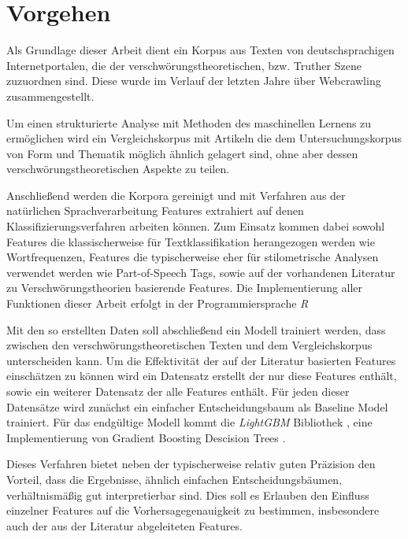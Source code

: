 \section{Vorgehen}

Als Grundlage dieser Arbeit dient ein Korpus aus Texten von deutschsprachigen Internetportalen, die der verschwörungstheoretischen, bzw. Truther Szene zuzuordnen sind.
Diese wurde im Verlauf der letzten Jahre über Webcrawling zusammengestellt.

Um einen strukturierte Analyse mit Methoden des maschinellen Lernens zu ermöglichen wird ein Vergleichskorpus mit Artikeln die dem Untersuchungskorpus von Form und Thematik möglich ähnlich gelagert sind, ohne aber dessen verschwörungstheoretischen Aspekte zu teilen.

Anschließend werden die Korpora gereinigt und mit Verfahren aus der natürlichen Sprachverarbeitung Features extrahiert auf denen Klassifizierungsverfahren arbeiten können.
Zum Einsatz kommen dabei sowohl Features die klassischerweise für Textklassifikation herangezogen werden wie Wortfrequenzen, Features die typischerweise eher für stilometrische Analysen verwendet werden wie Part-of-Speech Tags, sowie auf der vorhandenen Literatur zu Verschwörungstheorien basierende Features.
Die Implementierung aller Funktionen dieser Arbeit erfolgt in der Programmiersprache \textit{R} \parencite{r_2021}

Mit den so erstellten Daten soll abschließend ein Modell trainiert werden, dass zwischen den verschwörungstheoretischen Texten und dem Vergleichskorpus unterscheiden kann.
Um die Effektivität der auf der Literatur basierten Features einschätzen zu können wird ein Datensatz erstellt der nur diese Features enthält, sowie ein weiterer Datensatz der alle Features enthält.
Für jeden dieser Datensätze wird zunächst ein einfacher Entscheidungsbaum als Baseline Model trainiert.
Für das endgültige Modell kommt die \textit{LightGBM} Bibliothek \parencite[][]{lightgbm}, eine Implementierung von Gradient Boosting Descision Trees \parencite*{friedman_2002}.

Dieses Verfahren bietet neben der typischerweise relativ guten Präzision den Vorteil, dass die Ergebnisse, ähnlich einfachen Entscheidungsbäumen, verhältnismäßig gut interpretierbar sind.
Dies soll es Erlauben den Einfluss einzelner Features auf die Vorhersagegenauigkeit zu bestimmen, insbesondere auch der aus der Literatur abgeleiteten Features.